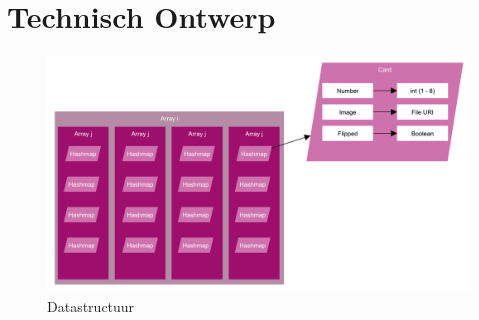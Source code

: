 \message{ !name(Document.tex)}\documentclass[a4paper,titlepage,11pt]{article}
\begin{document}
\clearpage

\section{Technisch Ontwerp}

\begin{figure}[!hb]
  \includegraphics[width=\linewidth]{../Images/datastructure.pdf}
  \caption{Datastructuur}\label{fig:datastructure}
\end{figure}
\end{document}
